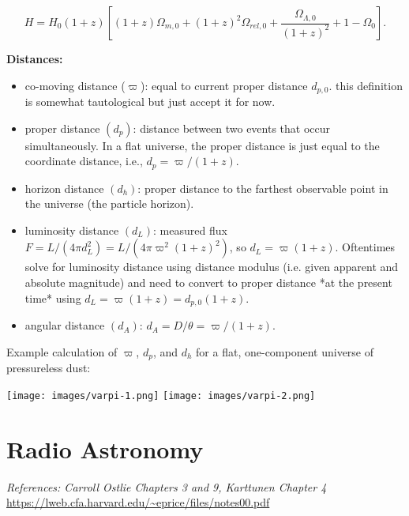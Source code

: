 \documentclass[12pt]{article}
\newcommand{\V}{

\vspace{\baselineskip}

}
\begin{document}
\[H = H_{0}(1+z)\left[(1+z)\Omega_{m,0} + (1+z)^{2}\Omega_{rel,0} + \frac{\Omega_{\Lambda,0}}{(1+z)^{2}} + 1-\Omega_{0}\right].\]\V

\textbf{Distances:}

\begin{itemize}
\item co-moving distance ($\varpi$): equal to current proper distance $d_{p,0}$. this definition is somewhat tautological but just accept it for now.
\item proper distance $(d_{p})$: distance between two events that occur simultaneously. In a flat universe, the proper distance is just equal to the coordinate distance, i.e., $d_{p} = \varpi/(1+z)$.
\item horizon distance $(d_{h})$: proper distance to the farthest observable point in the universe (the particle horizon).
\item luminosity distance $(d_{L})$: measured flux $F = L/(4\pi d_{L}^{2}) = L/(4\pi \varpi^{2} (1+z)^{2})$, so $d_{L} = \varpi (1+z)$. Oftentimes solve for luminosity distance using distance modulus (i.e. given apparent and absolute magnitude) and need to convert to proper distance *at the present time* using $d_L = \varpi (1+z) = d_{p,0} (1+z)$. 
\item angular distance $(d_{A})$: $d_{A} = D/\theta = \varpi/(1+z)$.
\end{itemize}

Example calculation of $\varpi$, $d_{p}$, and $d_{h}$ for a flat, one-component universe of pressureless dust: 

\begin{center}
\texttt{[image: images/varpi-1.png]}
\texttt{[image: images/varpi-2.png]}
\end{center}

\newpage
\section{Radio Astronomy}

\textit{References: Carroll Ostlie Chapters 3 and 9, Karttunen Chapter 4}\newline
\url{https://lweb.cfa.harvard.edu/~eprice/files/notes00.pdf}
\end{document}
